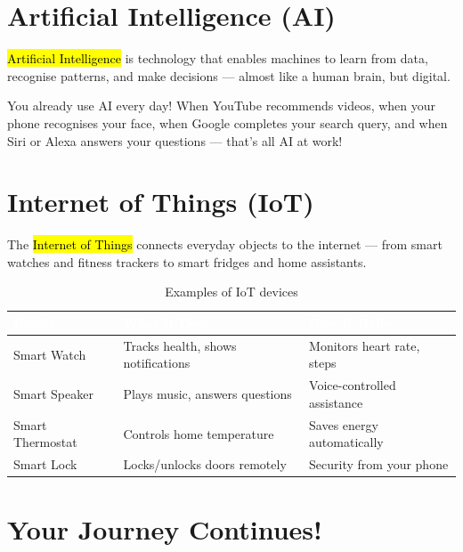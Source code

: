 \section{Artificial Intelligence (AI)}
\label{sec:ai}

\hl{Artificial Intelligence} is technology that enables machines to learn from data, recognise patterns, and make decisions --- almost like a human brain, but digital.

\begin{realworld}
You already use AI every day! When YouTube recommends videos, when your phone recognises your face, when Google completes your search query, and when Siri or Alexa answers your questions --- that's all AI at work!
\end{realworld}

\section{Internet of Things (IoT)}
\label{sec:iot}

The \hl{Internet of Things} connects everyday objects to the internet --- from smart watches and fitness trackers to smart fridges and home assistants.

\begin{table}[H]
\centering
\caption{Examples of IoT devices}
\label{tab:iot}
\renewcommand{\arraystretch}{1.3}
\begin{tabularx}{\textwidth}{l X X}
\toprule
\rowcolor{HeaderRow}
\textcolor{white}{\textbf{Device}} & \textcolor{white}{\textbf{What It Does}} & \textcolor{white}{\textbf{How It Helps}} \\
\midrule
\rowcolor{RowLight} Smart Watch & Tracks health, shows notifications & Monitors heart rate, steps \\
\rowcolor{RowDark} Smart Speaker & Plays music, answers questions & Voice-controlled assistance \\
\rowcolor{RowLight} Smart Thermostat & Controls home temperature & Saves energy automatically \\
\rowcolor{RowDark} Smart Lock & Locks/unlocks doors remotely & Security from your phone \\
\bottomrule
\end{tabularx}
\end{table}

\section{Your Journey Continues!}
\label{sec:journey}

